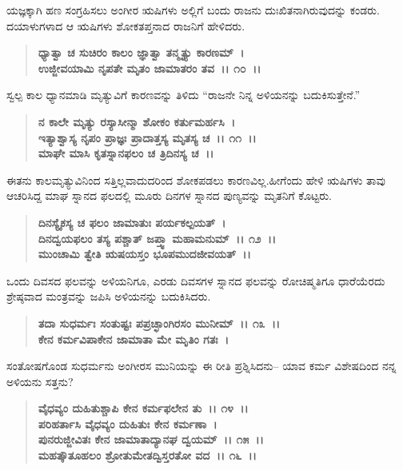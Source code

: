 ಯಜ್ಞಕ್ಕಾಗಿ ಹಣ ಸಂಗ್ರಹಿಸಲು ಅಂಗೀರ ಋಷಿಗಳು ಅಲ್ಲಿಗೆ ಬಂದು ರಾಜನು ದುಃಖಿತನಾಗಿರುವುದನ್ನು ಕಂಡರು. ದಯಾಳುಗಳಾದ ಆ ಋಷಿಗಳು ಶೋಕತಪ್ತನಾದ ರಾಜನಿಗೆ ಹೇಳಿದರು.

\begin{verse}
\textbf{ಧ್ಯಾತ್ವಾ ಚ ಸುಚಿರಂ ಕಾಲಂ ಜ್ಞಾತ್ವಾ ತನ್ಮೃತ್ಯು ಕಾರಣಮ್~।}\\\textbf{ಉಜ್ಜೀವಯಾಮಿ ನೃಪತೇ ಮೃತಂ ಜಾಮಾತರಂ ತವ~।। ೧೦~।।}
\end{verse}

ಸ್ವಲ್ಪ ಕಾಲ ಧ್ಯಾನಮಾಡಿ ಮೃತ್ಯುವಿಗೆ ಕಾರಣವನ್ನು ತಿಳಿದು “ರಾಜನೇ ನಿನ್ನ ಅಳಿಯನನ್ನು ಬದುಕಿಸುತ್ತೇನೆ.”

\begin{verse}
\textbf{ನ ಕಾಲೇ ಮೃತ್ಯು ರಸ್ಯಾಸೀನ್ಮಾ ಶೋಕಂ ಕರ್ತುಮರ್ಹಸಿ~।}\\\textbf{ಇತ್ಯಾಶ್ವಾಸ್ಯ ನೃಪಂ ಪ್ರಾಜ್ಞಃ ಪ್ರಾದಾತ್ತಸ್ಯ ಮೃತಸ್ಯ ಚ~।। ೧೧~।। }\\\textbf{ಮಾಘೇ ಮಾಸಿ ಕೃತಸ್ನಾನಫಲಂ ಚ ತ್ರಿದಿನಸ್ಯ ಚ~।।}
\end{verse}

ಈತನು ಕಾಲಮೃತ್ಯುವಿನಿಂದ ಸತ್ತಿಲ್ಲವಾದುದರಿಂದ ಶೋಕಪಡಲು ಕಾರಣವಿಲ್ಲ.\break ಹೀಗೆಂದು ಹೇಳಿ ಋಷಿಗಳು ತಾವು ಆಚರಿಸಿದ್ದ ಮಾಘ ಸ್ನಾನದ ಫಲದಲ್ಲಿ ಮೂರು ದಿನಗಳ ಸ್ನಾನದ ಪುಣ್ಯವನ್ನು ಮೃತನಿಗೆ ಕೊಟ್ಟರು.

\begin{verse}
\textbf{ದಿನಸ್ಯೈಕಸ್ಯ ಚ ಫಲಂ ಜಾಮಾತುಃ ಪರ್ಯಕಲ್ಪಯತ್~।}\\\textbf{ದಿನದ್ವಯಫಲಂ ತಸ್ಯ ಪಶ್ಚಾತ್ ಜಪ್ತ್ವಾ ಮಹಾಮನುಮ್~।। ೧೨~।। }\\\textbf{ಮುಂಚಾಮಿ ತ್ವೇತಿ ಋಷಯಸ್ತಂ ಭೂಪಮುದಜೀವಯತ್~।।}
\end{verse}

ಒಂದು ದಿವಸದ ಫಲವನ್ನು ಅಳಿಯನಿಗೂ, ಎರಡು ದಿವಸಗಳ ಸ್ನಾನದ ಫಲವನ್ನು ರೋಚಿಷ್ಮತಿಗೂ ಧಾರೆಯೆರದು ಶ್ರೇಷ್ಠವಾದ ಮಂತ್ರವನ್ನು ಜಪಿಸಿ ಅಳಿಯನನ್ನು ಬದುಕಿಸಿದರು.

\begin{verse}
\textbf{ತದಾ ಸುಧರ್ಮಃ ಸಂತುಷ್ಟಃ ಪಪ್ರಚ್ಛಾಂಗಿರಸಂ ಮುನೀಮ್~।। ೧೩~।।}\\\textbf{ಕೇನ ಕರ್ಮವಿಪಾಕೇನ ಜಾಮಾತಾ ಮೇ ಮೃತಿಂ ಗತಃ~।}
\end{verse}

ಸಂತೋಷಗೊಂಡ ಸುಧರ್ಮನು ಅಂಗೀರಸ ಮುನಿಯನ್ನು ಈ ರೀತಿ ಪ್ರಶ್ನಿಸಿದನು– ಯಾವ ಕರ್ಮ ವಿಶೇಷದಿಂದ ನನ್ನ ಅಳಿಯನು ಸತ್ತನು?

\begin{verse}
\textbf{ವೈಧವ್ಯಂ ದುಹಿತುಶ್ಚಾಪಿ ಕೇನ ಕರ್ಮಫಲೇನ ತು~।। ೧೪~।।}\\\textbf{ಪರಿಹರ್ತಾಸಿ ವೈಧವ್ಯಂ ದುಹಿತುಃ ಕೇನ ಕರ್ಮಣಾ~।}\\\textbf{ಪುನರುಜ್ಜೀವಿತಃ ಕೇನ ಜಾಮಾತಾದ್ಯಾನಘ ದ್ವಯಮ್~।। ೧೫~।।}\\\textbf{ಮಹತ್ಕೌತೂಹಲಂ ಶ್ರೋತುಮೇತದ್ವಿಸ್ತರತೋ ವದ~।। ೧೬~।।}
\end{verse}

